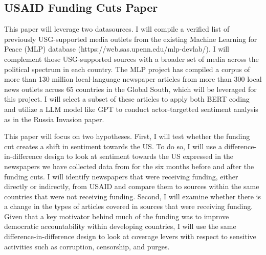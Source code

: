 \documentclass[12pt]{article}
\begin{document}
\subsection*{USAID Funding Cuts Paper}

This paper will leverage two datasources. I will compile a verified list of previously USG-supported media outlets from the existing Machine Learning for Peace (MLP) database (https://web.sas.upenn.edu/mlp-devlab/). I will complement those USG-supported sources with a broader set of media across the political spectrum in each country. The MLP project has compiled a corpus of more than 130 million local-language newspaper articles from more than 300 local news outlets across 65 countries in the Global South, which will be leveraged for this project. I will select a subset of these articles to apply both BERT coding and utilize a LLM model like GPT to conduct actor-targetted sentiment analysis as in the Russia Invasion paper.

This paper will focus on two hypotheses. First, I will test whether the funding cut creates a shift in sentiment towards the US. To do so, I will use a difference-in-difference design to look at sentiment towards the US expressed in the newspapers we have collected data from for the six months before and after the funding cuts. I will identify newspapers that were receiving funding, either directly or indirectly, from USAID and compare them to sources within the same countries that were not receiving funding. Second, I will examine whether there is a change in the types of articles covered in sources that were receiving funding. Given that a key motivator behind much of the funding was to improve democratic accountability within developing countries, I will use the same difference-in-difference design to look at coverage levers with respect to sensitive activities such as corruption, censorship, and purges.



\newpage

\printbibliography

%
%
\end{document}
